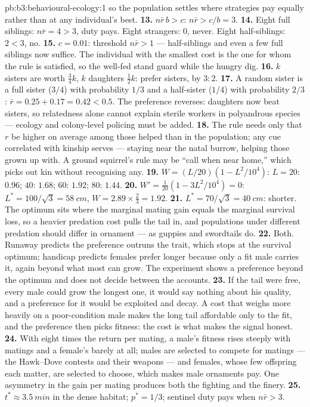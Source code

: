 \begin{solution}{pb:b3:behavioural-ecology:1}
so the population settles where strategies pay equally rather than at
any individual's best.
\textbf{13.} $n\bar r\,b > c$: $n\bar r > c/b = 3$.
\textbf{14.} Eight full siblings: $n\bar r = 4 > 3$, duty pays. Eight
strangers: $0$, never. Eight half-siblings: $2 < 3$, no.
\textbf{15.} $c = 0.01$: threshold $n\bar r > 1$ --- half-siblings and
even a few full siblings now suffice. The individual with the smallest
cost is the one for whom the rule is satisfied, so the well-fed stand
guard while the hungry dig.
\textbf{16.} $k$ sisters are worth $\tfrac{3}{4}k$, $k$ daughters
$\tfrac{1}{2}k$: prefer sisters, by $3{:}2$.
\textbf{17.} A random sister is a full sister ($3/4$) with probability
$1/3$ and a half-sister ($1/4$) with probability $2/3$: $\bar r = 0.25 +
0.17 = 0.42 < 0.5$. The preference reverses: daughters now beat sisters,
so relatedness alone cannot explain sterile workers in polyandrous
species --- ecology and colony-level policing must be added.
\textbf{18.} The rule needs only that $r$ be higher on average among
those helped than in the population; any cue correlated with kinship
serves --- staying near the natal burrow, helping those grown up with.
A ground squirrel's rule may be ``call when near home,'' which picks out
kin without recognising any.
\textbf{19.} $W = (L/20)(1 - L^{2}/10^{4})$: $L = 20$: $0.96$; $40$:
$1.68$; $60$: $1.92$; $80$: $1.44$.
\textbf{20.} $W' = \tfrac{1}{20}(1 - 3L^{2}/10^{4}) = 0$: $L^{*} = 100/\sqrt{3}
= \qty{58}{cm}$, $W = 2.89\times\tfrac{2}{3} = 1.92$.
\textbf{21.} $L^{*} = 70/\sqrt{3} = \qty{40}{cm}$: shorter. The optimum
sits where the marginal mating gain equals the marginal survival loss,
so a heavier predation cost pulls the tail in, and populations under
different predation should differ in ornament --- as guppies and
swordtails do.
\textbf{22.} Both. Runaway predicts the preference outruns the trait,
which stops at the survival optimum; handicap predicts females prefer
longer because only a fit male carries it, again beyond what most can
grow. The experiment shows a preference beyond the optimum and does not
decide between the accounts.
\textbf{23.} If the tail were free, every male could grow the longest
one, it would say nothing about his quality, and a preference for it
would be exploited and decay. A cost that weighs more heavily on a
poor-condition male makes the long tail affordable only to the fit,
and the preference then picks fitness: the cost is what makes the
signal honest.
\textbf{24.} With eight times the return per mating, a male's fitness
rises steeply with matings and a female's barely at all; males are
selected to compete for matings --- the Hawk--Dove contests and their
weapons --- and females, whose few offspring each matter, are selected
to choose, which makes male ornaments pay. One asymmetry in the gain
per mating produces both the fighting and the finery.
\textbf{25.} $t^{*} \approx \qty{3.5}{min}$ in the dense habitat; $p^{*}
= 1/3$; sentinel duty pays when $n\bar r > 3$.
\end{solution}
